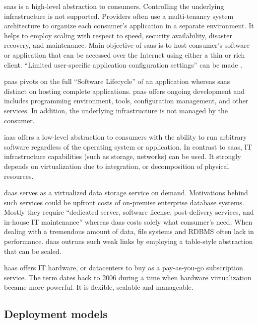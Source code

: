 \ac{saas} is a high-level abstraction to consumers. Controlling the underlying infrastructure is not supported.
Providers often use a multi-tenancy system architecture to organize each consumer's application in a separate environment.
It helps to employ scaling with respect to speed, security availability, disaster recovery, and maintenance.
Main objective of \ac{saas} is to host consumer's software or application that can be accessed over the Internet using either a thin or rich client. \cite{Dillon2010}
\enquote{Limited user-specific application configuration settings} can be made \cite{Mell2011}.

\ac{paas} pivots on the full \enquote{Software Lifecycle} of an application whereas \ac{saas} distinct on hosting complete applications.
\ac{paas} offers ongoing development and includes programming environment, tools, configuration management, and other services.
In addition, the underlying infrastructure is not managed by the consumer. \cite{Mell2011}

\ac{iaas} offers a low-level abstraction to consumers with the ability to run arbitrary software regardless of the operating system or application.
In contrast to \ac{saas}, IT infrastructure capabilities (such as storage, networks) can be used.
It strongly depends on virtualization due to integration, or decomposition of physical resources. \cite{Mell2011}

\ac{daas} serves as a virtualized data storage service on demand. Motivations behind such services could be upfront costs of on-premise enterprise database systems. \cite{Dillon2010}
Mostly they require \enquote{dedicated server, software license, post-delivery services, and in-house IT maintenance} \cite{Dillon2010} whereas \ac{daas} costs solely what consumer's need.
When dealing with a tremendous amount of data, file systems and RDBMS often lack in performance.
\ac{daas} outruns such weak links by employing a table-style abstraction that can be scaled. \cite{Dillon2010}

\ac{haas} offers IT hardware, or datacenters to buy as a pay-as-you-go subscription service.
The term dates back to 2006 during a time when hardware virtualization became more powerful.
It is flexible, scalable and manageable. \cite{Wang2010}

\subsection{Deployment models}
\label{subsec:cloud-deployment}


